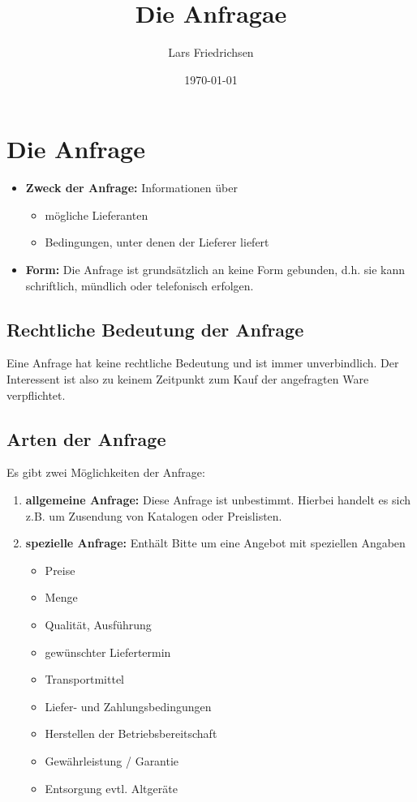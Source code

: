 \documentclass[a4paper,11pt]{scrartcl}	%
\title{Die Anfragae}
\author{Lars Friedrichsen}
\date{\today}
\begin{document}
\section{Die Anfrage}

\begin{itemize}
 \item \textbf{Zweck der Anfrage:} Informationen über
 	\begin{itemize}
 		\item mögliche Lieferanten
 		\item Bedingungen, unter denen der Lieferer liefert
 	\end{itemize}
 \item \textbf{Form:} Die Anfrage ist grundsätzlich an keine Form gebunden, d.h. sie kann schriftlich, mündlich
 oder telefonisch erfolgen.
\end{itemize}

	\subsection{Rechtliche Bedeutung der Anfrage}
	Eine Anfrage hat keine rechtliche Bedeutung und ist immer unverbindlich. Der Interessent ist also zu keinem
	Zeitpunkt zum Kauf der angefragten Ware verpflichtet.
	
	\subsection{Arten der Anfrage}
	Es gibt zwei Möglichkeiten der Anfrage:	
	
	\begin{enumerate}
		\item \textbf{allgemeine Anfrage:} Diese Anfrage ist unbestimmt. Hierbei handelt es sich z.B. um Zusendung
		von Katalogen oder Preislisten.
		\item \textbf{spezielle Anfrage:} Enthält Bitte um eine Angebot mit speziellen Angaben
			\begin{itemize}
				\item Preise
				\item Menge
				\item Qualität, Ausführung
				\item gewünschter Liefertermin
				\item Transportmittel
				\item Liefer- und Zahlungsbedingungen
				\item Herstellen der Betriebsbereitschaft
				\item Gewährleistung / Garantie
				\item Entsorgung evtl. Altgeräte
			\end{itemize}
	\end{enumerate}
	
\end{document}
